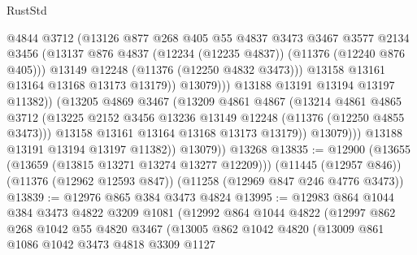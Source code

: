 \begin{lexlean}{RustStd}
\begin{coremodule}
{{{{{{{{{{{{{{{{{{{                              @4844
                              @3712
                              (@13126
                                @877
                                @268
                                @405
                                @55
                                @4837
                                @3473
                                @3467
                                @3577
                                @2134
                                @3456
                                (@13137
                                  @876
                                  @4837
                                  (@12234 (@12235 @4837))
                                  (@11376 (@12240 @876 @405)))
                                @13149
                                @12248
                                (@11376 (@12250 @4832 @3473)))
                              @13158
                              @13161
                              @13164
                              @13168
                              @13173
                              @13179))
                          @13079)))
                    @13188
                    @13191
                    @13194
                    @13197
                    @11382))
                (@13205
                  @4869
                  @3467
                  (@13209
                    @4861
                    @4867
                    (@13214
                      @4861
                      @4865
                      @3712
                      (@13225 @2152 @3456 @13236 @13149 @12248 (@11376 (@12250 @4855 @3473)))
                      @13158
                      @13161
                      @13164
                      @13168
                      @13173
                      @13179))
                  @13079)))
            @13188
            @13191
            @13194
            @13197
            @11382))
        @13079))
    @13268
@13835 := @12900
    (@13655 (@13659 (@13815 @13271 @13274 @13277 @12209)))
    (@11445 (@12957 @846))
    (@11376 (@12962 @12593 @847))
    (@11258 (@12969 @847 @246 @4776 @3473))
@13839 := @12976 @865 @384 @3473 @4824
@13995 := @12983
    @864
    @1044
    @384
    @3473
    @4822
    @3209
    @1081
    (@12992
      @864
      @1044
      @4822
      (@12997
        @862
        @268
        @1042
        @55
        @4820
        @3467
        (@13005
          @862
          @1042
          @4820
          (@13009
            @861
            @1086
            @1042
            @3473
            @4818
            @3309
            @1127
}}}}}}}}}}}}}}}}}}}
\end{coremodule}
\end{lexlean}
